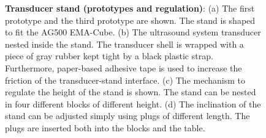 \begin{figure}
	\centering
		\hspace{0.05\textwidth}

		\hspace{0.05\textwidth}

	\caption[Transducer stand (prototypes and regulation)]{\textbf{Transducer stand (prototypes and regulation)}:
	(a) The first prototype and the third prototype are shown. 
	The stand is shaped to fit the AG500 EMA-Cube. 
	(b) The ultrasound system transducer nested inside the stand. The transducer
	shell is wrapped with a piece of gray rubber kept tight by a black plastic strap.
	Furthermore, paper-based adhesive tape is used to increase the friction of
	the transducer-stand interface.
	(c) The mechanism to regulate the height of the stand is shown. 
	The stand can be nested in four different blocks of different height.
	(d) The inclination of the stand can be adjusted simply using plugs of
	different length. The plugs are inserted both into the blocks and the table.
	}
	\label{fig:linguometer:od:stand}
\end{figure}
